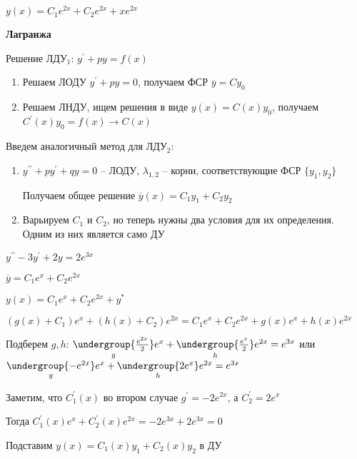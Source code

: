 \documentclass[12pt]{article}
\begin{document}
    $y(x) = C_1 e^{2x} + C_2 e^{2x} + xe^{2x}$

    \mediumvspace

    \hypertarget{methodLagrangesecondorder}{}

    \item \textbf{Лагранжа}

    \Mems Решение ЛДУ$_1$: $y^\prime + py = f(x)$

    \begin{enumerate}[label*=\arabic*) ]
        \item Решаем ЛОДУ $y^\prime + py = 0$, получаем ФСР $\overline{y} = Cy_0$

        \item Решаем ЛНДУ, ищем решения в виде $y(x) = C(x)y_0$, получаем $C^\prime(x) y_0 = f(x) \to C(x)$
    \end{enumerate}

    \Nota Введем аналогичный метод для ЛДУ$_2$:

    \begin{enumerate}[label*=\arabic* этап) ]
        \item $y^{\prime\prime} + py^\prime + qy = 0$ -- ЛОДУ, $\lambda_{1, 2}$ -- корни, соответствующие ФСР $\{y_1, y_2\}$

        Получаем общее решение $\overline{y}(x) = C_1 y_1 + C_2 y_2$

        \item Варьируем $C_1$ и $C_2$, но теперь нужны два условия для их определения. Одним из них является само ДУ
    \end{enumerate}

    \Ex $y^{\prime\prime} - 3y^\prime + 2y = 2e^{3x}$

    $\overline{y} = C_1 e^x + C_2 e^{2x}$

    $y(x) = C_1 e^x + C_2 e^{2x} + y^*$

    $(g(x) + C_1)e^x + (h(x) + C_2)e^{2x} = C_1 e^x + C_2 e^{2x} + g(x)e^x + h(x)e^{2x}$

    Подберем $g, h$: $\underset{g}{\undergroup{\frac{e^{2x}}{2}}}e^x + \underset{h}{\undergroup{\frac{e^x}{2}}}e^{2x} = e^{3x}$ или
    $\underset{g}{\undergroup{-e^{2x}}} e^x + \underset{h}{\undergroup{2e^x}} e^{2x} = e^{3x}$

    Заметим, что $C_1^\prime(x)$ во втором случае $g^\prime = -2e^{2x}$, а $C_2^\prime = 2e^x$

    Тогда $C_1^\prime(x) e^x + C^\prime_2 (x) e^{2x} = -2e^{3x} + 2e^{3x} = 0$

    \Nota Подставим $y(x) = C_1 (x) y_1 + C_2 (x) y_2$ в ДУ
\end{document}
